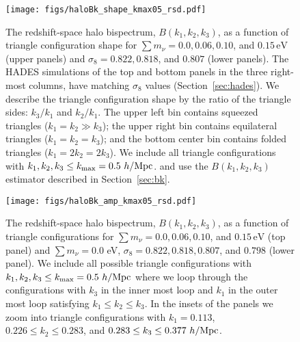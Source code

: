 \documentclass[12pt, letterpaper, preprint]{aastex62}
\newcommand{\smnu}{\sum m_\nu}
\newcommand{\sig}{\sigma_8}
\begin{document}
\begin{figure}
\begin{center}
    \texttt{[image: figs/haloBk\_shape\_kmax05\_rsd.pdf]} 
    \caption{The redshift-space halo bispectrum, $B(k_1, k_2, k_3)$, as a 
    function of triangle configuration shape for $\smnu = 0.0, 0.06, 0.10$, 
    and $0.15\,\mathrm{eV}$ (upper panels) and $\sig = 0.822, 0.818$, and 
    $0.807$ (lower panels). The HADES simulations of the top and bottom 
    panels in the three right-most columns, have matching $\sig$ values 
    (Section~\ref{sec:hades}). We describe the triangle configuration shape 
    by the ratio of the triangle sides: $k_3/k_1$ and $k_2/k_1$. The upper 
    left bin contains squeezed triangles ($k_1 = k_2 \gg k_3$); the upper 
    right bin contains equilateral triangles ($k_1 = k_2 = k_3$); and the 
    bottom center bin contains folded triangles ($k_1 = 2 k_2 = 2 k_3$). 
    We include all triangle configurations with $k_1, k_2, k_3 \leq k_{\rm max} = 0.5~h/{\rm Mpc}$. 
    and use the $B(k_1, k_2, k_3)$ estimator described in Section~\ref{sec:bk}.}
\label{fig:bk_shape}
\end{center}
\end{figure}

\begin{figure}
\begin{center}
\texttt{[image: figs/haloBk\_amp\_kmax05\_rsd.pdf]}
    \caption{The redshift-space halo bispectrum, $B(k_1, k_2, k_3)$, as a
    function of triangle configurations for $\smnu = 0.0, 0.06, 0.10$, 
    and $0.15\,\mathrm{eV}$ (top panel) and $\smnu = 0.0$ eV, $\sig = 0.822, 0.818, 0.807$, 
    and $0.798$ (lower panel). We include all possible triangle configurations 
    with $k_1, k_2, k_3 \leq k_{\rm max} = 0.5~h/{\rm Mpc}$ where we loop 
    through the configurations with $k_3$ in the inner most loop and 
    $k_1$ in the outer most loop satisfying $k_1 \leq k_2 \leq k_3$. In the 
    insets of the panels we zoom into triangle configurations with 
    $k_1 = 0.113$, $0.226 \leq k_2 \leq 0.283$, and $0.283 \leq k_3 \leq 0.377~h/{\rm Mpc}$.}
\label{fig:bk_amp}
\end{center}
\end{figure}


\end{document}
